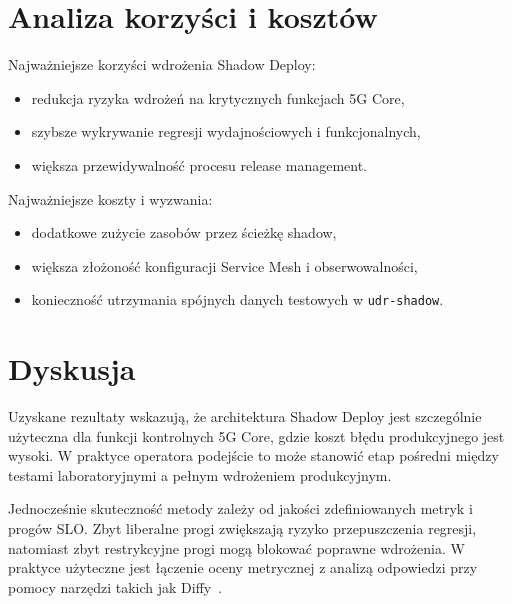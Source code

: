 \section{Analiza korzyści i kosztów}
Najważniejsze korzyści wdrożenia Shadow Deploy:
\begin{itemize}
    \item redukcja ryzyka wdrożeń na krytycznych funkcjach 5G Core,
    \item szybsze wykrywanie regresji wydajnościowych i funkcjonalnych,
    \item większa przewidywalność procesu release management.
\end{itemize}

Najważniejsze koszty i wyzwania:
\begin{itemize}
    \item dodatkowe zużycie zasobów przez ścieżkę shadow,
    \item większa złożoność konfiguracji Service Mesh i obserwowalności,
    \item konieczność utrzymania spójnych danych testowych w \texttt{udr-shadow}.
\end{itemize}

\section{Dyskusja}
Uzyskane rezultaty wskazują, że architektura Shadow Deploy jest szczególnie użyteczna dla funkcji kontrolnych 5G Core, gdzie koszt błędu produkcyjnego jest wysoki. W praktyce operatora podejście to może stanowić etap pośredni między testami laboratoryjnymi a pełnym wdrożeniem produkcyjnym.

Jednocześnie skuteczność metody zależy od jakości zdefiniowanych metryk i progów SLO. Zbyt liberalne progi zwiększają ryzyko przepuszczenia regresji, natomiast zbyt restrykcyjne progi mogą blokować poprawne wdrożenia. W praktyce użyteczne jest łączenie oceny metrycznej z analizą odpowiedzi przy pomocy narzędzi takich jak Diffy~\cite{diffyGithub}.


